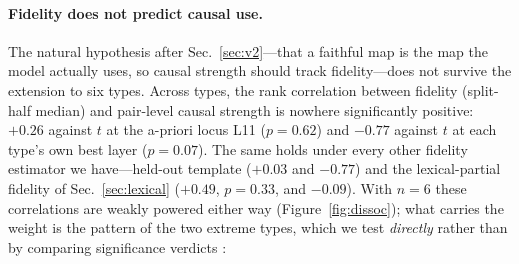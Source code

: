 \paragraph{Fidelity does not predict causal use.} The natural hypothesis
after Sec.~\ref{sec:v2}---that a faithful map is the map the model
actually uses, so causal strength should track fidelity---does not
survive the extension to six types. Across types, the rank correlation
between fidelity (split-half median) and pair-level causal strength is
nowhere significantly positive: $+0.26$ against $t$ at the a-priori
locus L11 ($p=0.62$) and $-0.77$ against $t$ at each type's own best
layer ($p=0.07$). The same holds under every other fidelity estimator we
have---held-out template ($+0.03$ and $-0.77$) and the lexical-partial
fidelity of Sec.~\ref{sec:lexical} ($+0.49$, $p=0.33$, and
$-0.09$). With $n{=}6$ these correlations are weakly
powered either way (Figure~\ref{fig:dissoc}); what carries the weight is
the pattern of the two extreme types, which we test \emph{directly}
rather than by comparing significance verdicts \citep{gelman2006}:

